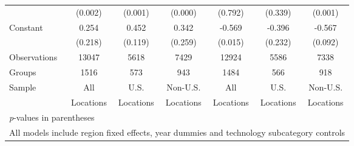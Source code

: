 \begin{table}[htbp]
\begin{tabular}{l*{6}{c}}
                &  (0.002)&  (0.001)&  (0.000)&  (0.792)&  (0.339)&  (0.001)\\
Constant        &    0.254&    0.452&    0.342&   -0.569&   -0.396&   -0.567\\
                &  (0.218)&  (0.119)&  (0.259)&  (0.015)&  (0.232)&  (0.092)\\
\hline
Observations    &    13047&     5618&     7429&    12924&     5586&     7338\\
Groups          &     1516&      573&      943&     1484&      566&      918\\
Sample&All &U.S. &Non-U.S.&All &U.S. &Non-U.S. \\
          &Locations &Locations&Locations&Locations &Locations&Locations \\\hline\hline
\multicolumn{7}{l}{\footnotesize \textit{p}-values in parentheses}\\
\multicolumn{7}{l}{\footnotesize All models include region fixed effects, year dummies and technology subcategory controls}\\
\end{tabular}
\end{table}
